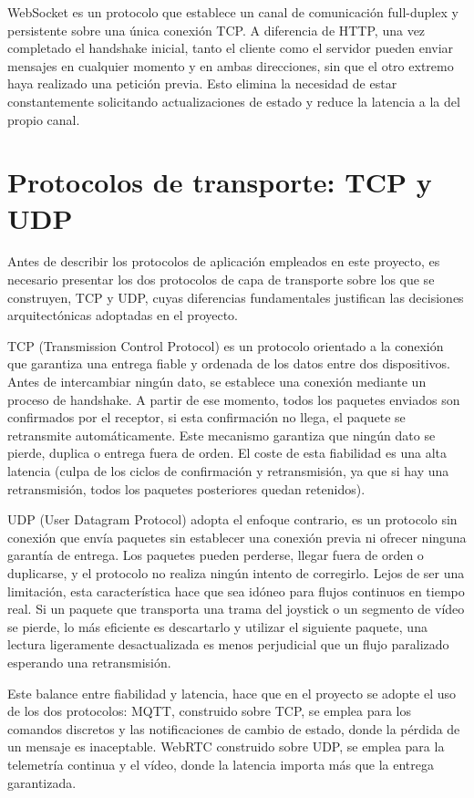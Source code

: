 WebSocket\cite{websocket} es un protocolo que establece un canal de comunicación full-duplex y persistente sobre una única conexión TCP. A diferencia de HTTP, una vez completado el handshake inicial, tanto el cliente como el servidor pueden enviar mensajes en cualquier momento y en ambas direcciones, sin que el otro extremo haya realizado una petición previa. Esto elimina la necesidad de estar constantemente solicitando actualizaciones de estado y reduce la latencia a la del propio canal. 

\section{Protocolos de transporte: TCP y UDP}
Antes de describir los protocolos de aplicación empleados en este proyecto, es necesario presentar los dos protocolos de capa de transporte sobre los que se construyen, TCP y UDP, cuyas diferencias fundamentales justifican las decisiones arquitectónicas adoptadas en el proyecto.

TCP (Transmission Control Protocol)\cite{tcp} es un protocolo orientado a la conexión que garantiza una entrega fiable y ordenada de los datos entre dos dispositivos. Antes de intercambiar ningún dato, se establece una conexión mediante un proceso de handshake. A partir de ese momento, todos los paquetes enviados son confirmados por el receptor, si esta confirmación no llega, el paquete se retransmite automáticamente. Este mecanismo garantiza que ningún dato se pierde, duplica o entrega fuera de orden. El coste de esta fiabilidad es una alta latencia (culpa de los ciclos de confirmación y retransmisión, ya que si hay una retransmisión, todos los paquetes posteriores quedan retenidos).

UDP (User Datagram Protocol)\cite{udp} adopta el enfoque contrario, es un protocolo sin conexión que envía paquetes sin establecer una conexión previa ni ofrecer ninguna garantía de entrega. Los paquetes pueden perderse, llegar fuera de orden o duplicarse, y el protocolo no realiza ningún intento de corregirlo. Lejos de ser una limitación, esta característica hace que sea idóneo para flujos continuos en tiempo real. Si un paquete que transporta una trama del joystick o un segmento de vídeo se pierde, lo más eficiente es descartarlo y utilizar el siguiente paquete, una lectura ligeramente desactualizada es menos perjudicial que un flujo paralizado esperando una retransmisión.

Este balance entre fiabilidad y latencia, hace que en el proyecto se adopte el uso de los dos protocolos: MQTT, construido sobre TCP, se emplea para los comandos discretos y las notificaciones de cambio de estado, donde la pérdida de un mensaje es inaceptable. WebRTC construido sobre UDP, se emplea para la telemetría continua y el vídeo, donde la latencia importa más que la entrega garantizada.

